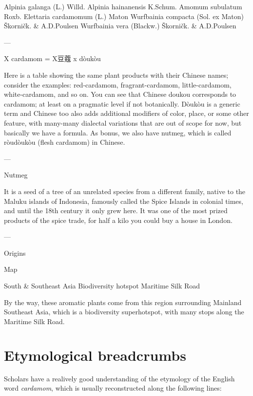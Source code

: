 \documentclass[12pt]{article}
\begin{document}
Alpinia galanga (L.) Willd. 
Alpinia hainanensis K.Schum.	
Amomum subulatum Roxb.	
Elettaria cardamomum (L.) Maton 
Wurfbainia compacta (Sol. ex Maton) Škorničk. \& A.D.Poulsen
Wurfbainia vera (Blackw.) Škorničk. \& A.D.Poulsen

---

X cardamom  = X豆蔻 x dòukòu



Here is a table showing the same plant products with their Chinese names; consider the examples: red-cardamom, fragrant-cardamom, little-cardamom, white-cardamom, and so on.
You can see that Chinese doukou corresponds to cardamom; at least on a pragmatic level if not botanically. 
Dòukòu is a generic term and Chinese too also adds additional modifiers of color, place, or some other feature, with many-many dialectal variations that are out of scope for now, but basically we have a formula.
As bonus, we also have nutmeg, which is called ròudòukòu (flesh cardamom) in Chinese.

---

Nutmeg

It is a seed of a tree of an unrelated species from a different family, native to the Maluku islands of Indonesia, famously called the Spice Islands in colonial times, and until the 18th century it only grew here. It was one of the most prized products of the spice trade, for half a kilo you could buy a house in London. 


---

Origins

Map

South \& Southeast Asia
Biodiversity hotspot
Maritime Silk Road

By the way, these aromatic plants come from this region surrounding Mainland Southeast Asia, which is a biodiversity superhotspot, with many stops along the Maritime Silk Road.









\section{Etymological breadcrumbs}

Scholars have a realively good understanding of the etymology of the English word \textit{cardamom}, which is usually reconstructed along the following lines:
\end{document}
